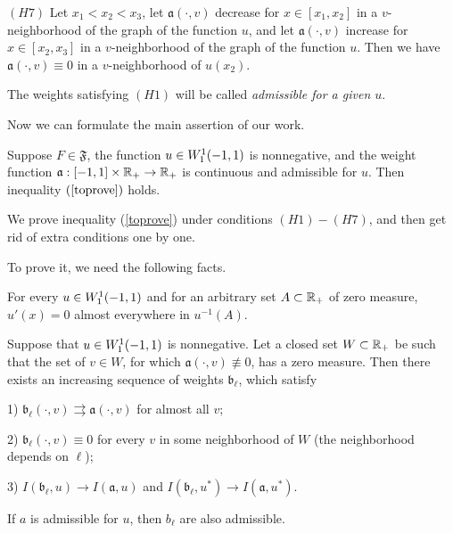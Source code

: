 \bigskip
\noindent
$(H7)$ Let $x_1 < x_2 < x_3$,
let $\mathfrak a(\cdot, v)$ decrease for $x \in [x_1, x_2]$ in a $v$-neighborhood of the graph of the function $u$,
and let $\mathfrak a(\cdot, v)$ increase for $x \in [x_2, x_3]$ in a $v$-neighborhood of the graph of the function $u$.
Then we have $\mathfrak a(\cdot, v) \equiv 0$ in a $v$-neighborhood of $u(x_2)$.

\bigskip

The weights satisfying $(H1)$ will be called {\it admissible for a given $u$}.

\medskip

Now we can formulate the main assertion of our work.
\begin{thm}
\label{mainThm}
Suppose $F \in \mathfrak{F}$, the function $u \in W_1^1(-1, 1)$ is nonnegative,
and the weight function $\mathfrak a: [-1, 1] \times \mathbb R_+ \to \mathbb R_+$ is continuous
and admissible for $u$.
Then inequality $(\ref{toprove})$ holds.
\end{thm}

We prove inequality (\ref{toprove}) under conditions $(H1)-(H7)$,
and then get rid of extra conditions one by one.

To prove it, we need the following facts.

\begin{prop}
\label{levelDerivative}
{\rm \cite[Theorem 6.19]{LL} }
For every $u \in W_1^1(-1, 1)$ and for an arbitrary set $A \subset \mathbb R_+$ of zero measure,
$u'(x) = 0$ almost everywhere in $u^{-1}(A)$.
\end{prop}

\begin{lm}
\label{zeroApprox}
Suppose that $u \in W_1^1(-1, 1)$ is nonnegative.
Let a closed set $W \subset \mathbb R_+$ be such that
the set of $v \in W$, for which $\mathfrak a(\cdot, v) \not\equiv 0$, has a zero measure.
Then there exists an increasing sequence of weights $\mathfrak b_{\ell}$, which satisfy

1) $\mathfrak b_{\ell}(\cdot, v) \rightrightarrows \mathfrak a(\cdot, v)$ for almost all $v$;

2) $\mathfrak b_{\ell}(\cdot, v) \equiv 0$ for every $v$ in some neighborhood of $W$ (the neighborhood depends on $\ell$);

3) $I(\mathfrak b_{\ell}, u) \to I(\mathfrak a, u)$ and $I(\mathfrak b_{\ell}, u^*) \to I(\mathfrak a, u^*)$.
\end{lm}

\begin{rem}
If $a$ is admissible for $u$, then $b_{\ell}$ are also admissible.
\end{rem}

